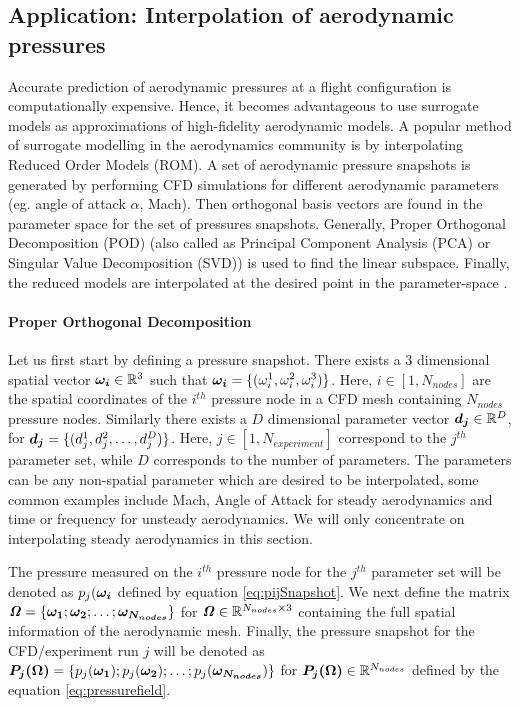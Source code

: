 \subsection{Application: Interpolation of aerodynamic pressures}\label{subecInterpolationOfAerodynamicPressures}
Accurate prediction of aerodynamic pressures at a flight configuration is computationally expensive. Hence, it becomes advantageous to use surrogate models as approximations of high-fidelity aerodynamic models. A popular method of surrogate modelling in the aerodynamics community is by interpolating Reduced Order Models (ROM). A set of aerodynamic pressure snapshots is generated by performing CFD simulations for different aerodynamic parameters (eg. angle of attack $\alpha$, Mach). Then orthogonal basis vectors are found in the parameter space for the set of pressures snapshots. Generally, Proper Orthogonal Decomposition (POD) \cite{tan2003proper, rosenbaum2013efficient, braconnier2011towards} (also called as Principal Component Analysis (PCA) or Singular Value Decomposition (SVD)) is used to find the linear subspace. Finally, the reduced models are interpolated at the desired point in the parameter-space \cite{beckert2001multivariate, barrault2004empirical}. 

\paragraph{Proper Orthogonal Decomposition}
Let us first start by defining a pressure snapshot. There exists a \(3\) dimensional spatial vector \(\boldsymbol{\omega_{i}} \in  \mathbb{R}^{3}\) such that \(\boldsymbol{\omega_{i}} = \{(\omega_{i}^{1}, \omega_{i}^{2}, \omega_{i}^{3})\}\). Here, \(i \in [1,N_{nodes}] \) are the spatial coordinates of the \(i^{th}\) pressure node in a CFD mesh containing \(N_{nodes}\) pressure nodes. Similarly there exists a \(D\) dimensional parameter vector \(\boldsymbol{d_{j}} \in  \mathbb{R}^{D}\), for \(\boldsymbol{d_{j}} = \{(d_{j}^{1}, d_{j}^{2}, \ldots ,d_{j}^{D})\}\). Here,   \(j \in [1,N_{experiment}] \) correspond to the \(j^{th}\) parameter set, while $D$ corresponds to the number of parameters. The parameters can be any non-spatial parameter which are desired to be interpolated, some common examples include Mach, Angle of Attack for steady aerodynamics and time or frequency for unsteady aerodynamics. We will only concentrate on interpolating steady aerodynamics in this section.

The pressure measured on the \(i^{th}\) pressure node for the \(j^{th}\) parameter set will be denoted as \(p_{j}(\boldsymbol{\omega_{i}}\) defined by equation \ref{eq:pijSnapshot}. We next define the matrix \(\bm{\mathit{\Omega}} = \{\boldsymbol{\omega_{1}}; \boldsymbol{\omega_{2}}; \ldots ; \boldsymbol{\omega_{N_{nodes}}}\}\) for \(\bm{\mathit{\Omega}} \in \mathbb{R}^{N_{nodes} \times 3}\) containing the full spatial information of the aerodynamic mesh. Finally, the pressure snapshot for the CFD/experiment run \(j\) will be denoted as \(\boldsymbol{P_{j}(\Omega)} = \{p_{j}(\boldsymbol{\omega_{1}}); p_{j}(\boldsymbol{\omega_{2}}); \ldots ; p_{j}(\boldsymbol{\omega_{N_{nodes}}})\}\) for \(\boldsymbol{P_{j}(\Omega)} \in \mathbb{R}^{N_{nodes}}\) defined by the equation \ref{eq:pressurefield}.

